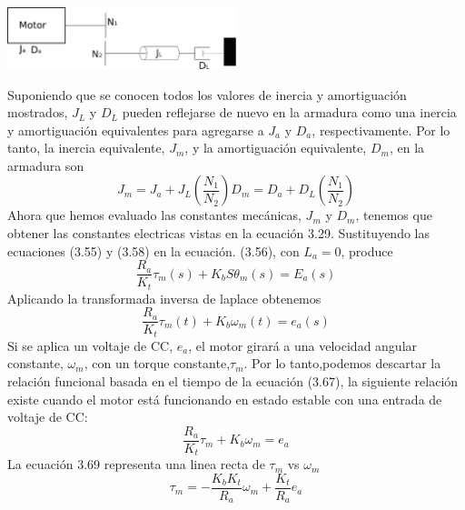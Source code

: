 \begin{center}
	\includegraphics[width=0.5\textwidth]{Contenido/Cuerpo/Capitulo3/Fig18.eps}
	\label{fig:ModeloMat:Fig1}
\end{center}
Suponiendo que se conocen todos los valores de inercia y amortiguación mostrados, $J_L$ y $D_L$ pueden reflejarse de nuevo en la
armadura como una inercia y amortiguación equivalentes para agregarse a $J_a$ y $D_a$, respectivamente. Por lo tanto, la inercia
equivalente, $J_m$, y la amortiguación equivalente, $D_m$, en la armadura son
\begin{subequations}
	\begin{equation}
		J_m = J_a + J_L \left( \frac{N_1}{N_2} \right)
	\end{equation}
	\begin{equation}
		D_m = D_a + D_L\left( \frac{N_1}{N_2} \right)
	\end{equation}
\end{subequations}
Ahora que hemos evaluado las constantes mecánicas, $J_m$ y $D_m$, tenemos que obtener las constantes electricas vistas en la
ecuación 3.29. Sustituyendo las ecuaciones (3.55) y (3.58) en la ecuación. (3.56), con $L_a = 0$, produce
\begin{equation}
	\frac{R_a}{K_t} \tau_m (s) + K_bS\theta_m(s) = E_a(s)
\end{equation}
Aplicando la transformada inversa de laplace obtenemos
\begin{equation}
	\frac{R_a}{K_t} \tau_m (t) + K_b\omega_m(t) = e_a(s)
\end{equation}
Si se aplica un voltaje de CC, $e_a$, el motor girará a una velocidad angular constante, $\omega_m$, con un torque constante,$\tau_m$.
Por lo tanto,podemos descartar la relación funcional basada en el tiempo de la ecuación (3.67), la siguiente relación existe
cuando el motor está funcionando en estado estable con una entrada de voltaje de CC:
\begin{equation}
	\frac{R_a}{K_t} \tau_m + K_b\omega_m = e_a
\end{equation}
La ecuación 3.69 representa una linea recta de $\tau_m$ vs $\omega_m$
\begin{equation}
	\tau_m = -\frac{K_bK_t}{R_a} \omega_m + \frac{K_t}{R_a}e_a
\end{equation}
